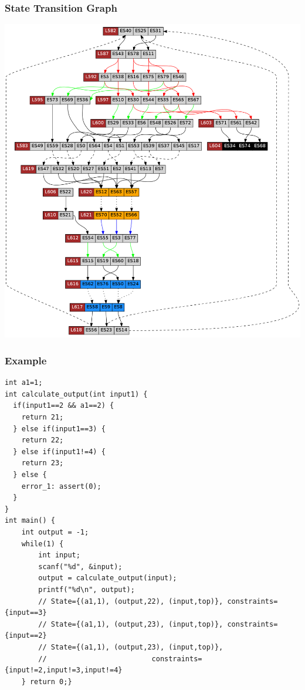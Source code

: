 \begin{frame}[fragile]
\frametitle{State Transition Graph}

\begin{center}
\includegraphics[height=0.65\columnwidth]{example1gfx1/transitiongraph2}
\end{center}


\end{frame}

\begin{frame}[fragile]
\frametitle{Example}
\vspace{-0.3cm}
{\scriptsize
\begin{verbatim}
int a1=1;
int calculate_output(int input1) {
  if(input1==2 && a1==2) {
    return 21;
  } else if(input1==3) {
    return 22;
  } else if(input1!=4) {
    return 23;
  } else {
    error_1: assert(0);
  }
}
int main() {
    int output = -1;
    while(1) {
        int input;
        scanf("%d", &input);        
        output = calculate_output(input);
        printf("%d\n", output);
        // State={(a1,1), (output,22), (input,top)}, constraints={input==3}
        // State={(a1,1), (output,23), (input,top)}, constraints={input==2}
        // State={(a1,1), (output,23), (input,top)}, 
        //                         constraints={input!=2,input!=3,input!=4}
    } return 0;}
\end{verbatim}
}
\end{frame}

